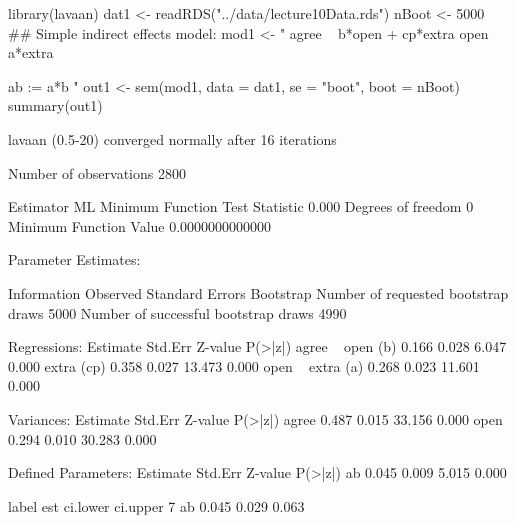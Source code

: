 \begin{Schunk}
\begin{Sinput}
 library(lavaan)
 dat1 <- readRDS("../data/lecture10Data.rds")
 nBoot <- 5000
 ## Simple indirect effects model:
 mod1 <- "
 agree ~ b*open + cp*extra
 open ~ a*extra
 
 ab := a*b
 "
 out1 <- sem(mod1, data = dat1, se = "boot", boot = nBoot)
 summary(out1)
\end{Sinput}
\begin{Soutput}
lavaan (0.5-20) converged normally after  16 iterations

  Number of observations                          2800

  Estimator                                         ML
  Minimum Function Test Statistic                0.000
  Degrees of freedom                                 0
  Minimum Function Value               0.0000000000000

Parameter Estimates:

  Information                                 Observed
  Standard Errors                            Bootstrap
  Number of requested bootstrap draws             5000
  Number of successful bootstrap draws            4990

Regressions:
                   Estimate  Std.Err  Z-value  P(>|z|)
  agree ~                                             
    open       (b)    0.166    0.028    6.047    0.000
    extra     (cp)    0.358    0.027   13.473    0.000
  open ~                                              
    extra      (a)    0.268    0.023   11.601    0.000

Variances:
                   Estimate  Std.Err  Z-value  P(>|z|)
    agree             0.487    0.015   33.156    0.000
    open              0.294    0.010   30.283    0.000

Defined Parameters:
                   Estimate  Std.Err  Z-value  P(>|z|)
    ab                0.045    0.009    5.015    0.000
\end{Soutput}
\begin{Soutput}
  label   est ci.lower ci.upper
7    ab 0.045    0.029    0.063
\end{Soutput}
\end{Schunk}
